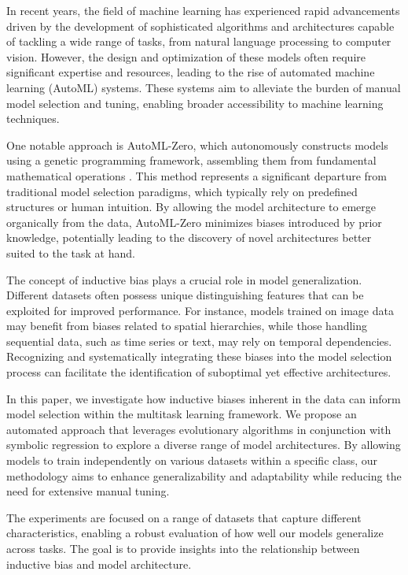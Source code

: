 \documentclass{article}
\begin{document}
In recent years, the field of machine learning has experienced rapid advancements driven by the development of sophisticated algorithms and architectures capable of tackling a wide range of tasks, from natural language processing to computer vision. However, the design and optimization of these models often require significant expertise and resources, leading to the rise of automated machine learning (AutoML) systems. These systems aim to alleviate the burden of manual model selection and tuning, enabling broader accessibility to machine learning techniques.

One notable approach is AutoML-Zero, which autonomously constructs models using a genetic programming framework, assembling them from fundamental mathematical operations \citep{automl-zero}. This method represents a significant departure from traditional model selection paradigms, which typically rely on predefined structures or human intuition. By allowing the model architecture to emerge organically from the data, AutoML-Zero minimizes biases introduced by prior knowledge, potentially leading to the discovery of novel architectures better suited to the task at hand.

The concept of inductive bias plays a crucial role in model generalization. Different datasets often possess unique distinguishing features that can be exploited for improved performance. For instance, models trained on image data may benefit from biases related to spatial hierarchies, while those handling sequential data, such as time series or text, may rely on temporal dependencies. Recognizing and systematically integrating these biases into the model selection process can facilitate the identification of suboptimal yet effective architectures.

In this paper, we investigate how inductive biases inherent in the data can inform model selection within the multitask learning framework. We propose an automated approach that leverages evolutionary algorithms in conjunction with symbolic regression to explore a diverse range of model architectures. By allowing models to train independently on various datasets within a specific class, our methodology aims to enhance generalizability and adaptability while reducing the need for extensive manual tuning.

The experiments are focused on a range of datasets that capture different characteristics, enabling a robust evaluation of how well our models generalize across tasks. The goal is to provide insights into the relationship between inductive bias and model architecture.
\end{document}
